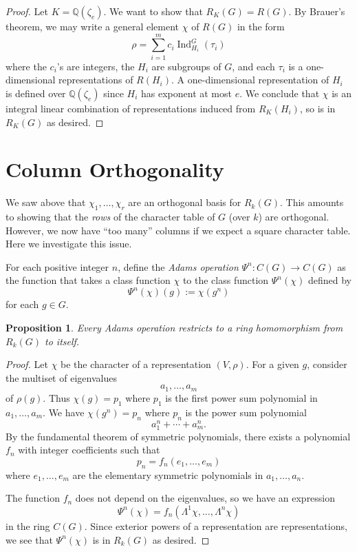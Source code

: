 \documentclass[12pt]{article}
\theoremstyle{plain}
\newtheorem{proposition}[theorem]{Proposition}
\theoremstyle{definition}
\theoremstyle{remark}
\numberwithin{equation}{section}
\begin{document}
\begin{proof}
Let $K=\mathbb{Q}(\zeta_e)$.  We want to show that $R_K(G)=R(G)$.
By Brauer's theorem, we may write a general element $\chi$ of $R(G)$
in the form
\[
\rho = \sum_{i=1}^m c_i\operatorname{Ind}_{H_i}^G(\tau_i)
\]
where the $c_i$'s are integers, the $H_i$ are subgroups of $G$,
and each $\tau_i$ is a one-dimensional representations of $R(H_i)$.
A one-dimensional representation of $H_i$ is defined over
$\mathbb{Q}(\zeta_e)$ since $H_i$ has exponent at most $e$.
We conclude that $\chi$ is an integral linear combination of
representations induced from $R_K(H_i)$, so is in $R_K(G)$ as desired.
\end{proof}

\section{Column Orthogonality}

We saw above that $\chi_1,\ldots,\chi_r$ are an orthogonal basis for
$R_k(G)$.  This amounts to showing that the \emph{rows} of the character
table of $G$ (over $k$) are orthogonal.
However, we now have ``too many'' columns if we expect a square
character table.
Here we investigate this issue.

For each positive integer $n$, define the \emph{Adams operation}
$\Psi^n : C(G) \to C(G)$ as the function that takes
a class function $\chi$ to the class function $\Psi^n(\chi)$ defined by
\[
\Psi^n(\chi)(g) := \chi(g^n)
\]
for each $g \in G$.

\begin{proposition}
Every Adams operation restricts to a ring homomorphism
from $R_k(G)$ to itself.
\end{proposition}

\begin{proof}
Let $\chi$ be the character of a representation $(V,\rho)$.
For a given $g$, consider the multiset of eigenvalues
\[
a_1,\ldots, a_m
\]
of $\rho(g)$.
Thus $\chi(g)=p_1$ where $p_1$ is the first power sum polynomial
in $a_1,\ldots, a_m$.
We have $\chi(g^n)=p_n$ where $p_n$ is the power sum polynomial
\[
a_1^n + \cdots + a_m^n.
\]
By the fundamental theorem of symmetric polynomials, there exists a
polynomial $f_n$ with integer coefficients such that
\[
p_n = f_n(e_1,\ldots,e_m)
\]
where $e_1,\ldots,e_m$ are the elementary symmetric polynomials
in $a_1,\ldots,a_n$.

The function $f_n$ does not depend on the eigenvalues, so we have an
expression
\[
\Psi^n(\chi) = f_n(\Lambda^1 \chi, \ldots, \Lambda^n \chi)
\]
in the ring $C(G)$. Since exterior powers of a representation are
representations, we see that $\Psi^n(\chi)$ is in $R_k(G)$ as desired.
\end{proof}
\end{document}
